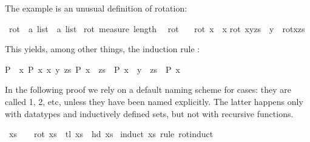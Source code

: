 \begin{isabellebody}
\begin{isamarkuptext}
The example is an unusual definition of rotation:%
\end{isamarkuptext}%
\isamarkuptrue%
\isamarkupfalse%
\ rot\ {\isacharcolon}{\isacharcolon}\ {\isachardoublequoteopen}{\isacharprime}a\ list\ {\isasymRightarrow}\ {\isacharprime}a\ list{\isachardoublequoteclose}\isanewline
{}\isamarkupfalse%
\ rot\ {\isachardoublequoteopen}measure\ length{\isachardoublequoteclose}\ \ %
\isanewline
{\isachardoublequoteopen}rot\ {\isacharbrackleft}{\isacharbrackright}\ {\isacharequal}\ {\isacharbrackleft}{\isacharbrackright}{\isachardoublequoteclose}\isanewline
{\isachardoublequoteopen}rot\ {\isacharbrackleft}x{\isacharbrackright}\ {\isacharequal}\ {\isacharbrackleft}x{\isacharbrackright}{\isachardoublequoteclose}\isanewline
{\isachardoublequoteopen}rot\ {\isacharparenleft}x{\isacharhash}y{\isacharhash}zs{\isacharparenright}\ {\isacharequal}\ y\ {\isacharhash}\ rot{\isacharparenleft}x{\isacharhash}zs{\isacharparenright}{\isachardoublequoteclose}%
\begin{isamarkuptext}%
\noindent This yields, among other things, the induction rule
: \begin{isabelle}%
{\isasymlbrakk}P\ {\isacharbrackleft}{\isacharbrackright}{\isacharsemicolon}\ {\isasymAnd}x{\isachardot}\ P\ {\isacharbrackleft}x{\isacharbrackright}{\isacharsemicolon}\ {\isasymAnd}x\ y\ zs{\isachardot}\ P\ {\isacharparenleft}x\ {\isacharhash}\ zs{\isacharparenright}\ {\isasymLongrightarrow}\ P\ {\isacharparenleft}x\ {\isacharhash}\ y\ {\isacharhash}\ zs{\isacharparenright}{\isasymrbrakk}\ {\isasymLongrightarrow}\ P\ x%
\end{isabelle}
In the following proof we rely on a default naming scheme for cases: they are
called 1, 2, etc, unless they have been named explicitly. The latter happens
only with datatypes and inductively defined sets, but not with recursive
functions.%
\end{isamarkuptext}%
\isamarkuptrue%
\isamarkupfalse%
\ {\isachardoublequoteopen}xs\ {\isasymnoteq}\ {\isacharbrackleft}{\isacharbrackright}\ {\isasymLongrightarrow}\ rot\ xs\ {\isacharequal}\ tl\ xs\ {\isacharat}\ {\isacharbrackleft}hd\ xs{\isacharbrackright}{\isachardoublequoteclose}\isanewline
%
\isadelimproof
%
\endisadelimproof
%
\isatagproof
{}\isamarkupfalse%
\ {\isacharparenleft}induct\ xs\ rule{\isacharcolon}\ rot{\isachardot}induct{\isacharparenright}\isanewline
\ \ \isamarkupfalse%
\ {}\ \isamarkupfalse%

\end{isabellebody}
